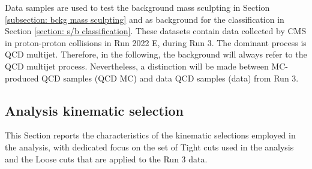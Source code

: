 Data samples are used to test the background mass sculpting in Section \ref{subsection: bckg mass sculpting} and as background for the classification in Section \ref{section: s/b classification}. These datasets contain data collected by CMS in proton-proton collisions in Run 2022 E, during Run 3. The dominant process is QCD multijet. Therefore, in the following, the background will always refer to the QCD multijet process. Nevertheless, a distinction will be made between MC-produced QCD samples (QCD MC) and data QCD samples (data) from Run 3.

\newpage

\subsection{Analysis kinematic selection} \label{subsection:cutflows}

This Section reports the characteristics of the kinematic selections employed in the analysis, with dedicated focus on the set of Tight cuts used in the analysis and the Loose cuts that are applied to the Run 3 data.

